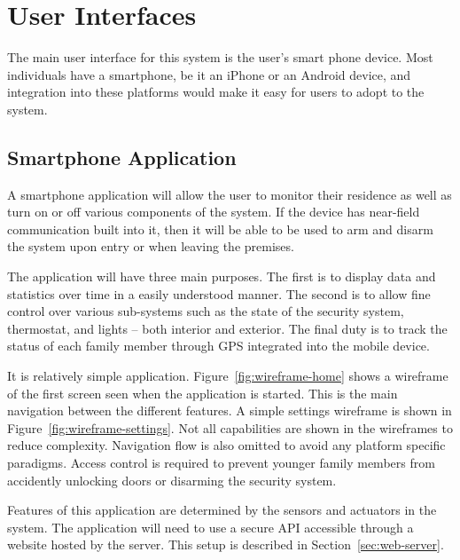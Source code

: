 \documentclass{report}
\begin{document}
\chapter{User Interfaces}
The main user interface for this system is the user's smart phone device. Most
individuals have a smartphone, be it an iPhone or an Android device, and
integration into these platforms would make it easy for users to adopt to the
system.


\section{Smartphone Application}
\label{sec:mobile-app}
A smartphone application will allow the user to monitor their residence as well
as turn on or off various components of the system. If the device has
near-field communication built into it, then it will be able to be used to
arm and disarm the system upon entry or when leaving the premises. 

The application will have three main purposes. The first is to display data and
statistics over time in a easily understood manner. The second is to allow fine
control over various sub-systems such as the state of the security system,
thermostat, and lights -- both interior and exterior. The final duty is to
track the status of each family member through GPS integrated into the mobile
device. 

It is relatively simple application. Figure~\ref{fig:wireframe-home} shows a
wireframe of the first screen seen when the application is started. This is the
main navigation between the different features. A simple settings wireframe is
shown in Figure~\ref{fig:wireframe-settings}. Not all capabilities are shown in
the wireframes to reduce complexity. Navigation flow is also omitted to avoid
any platform specific paradigms. Access control is required to prevent younger
family members from accidently unlocking doors or disarming the security
system.

Features of this application are determined by the sensors and actuators in the
system. The application will need to use a secure API accessible through a
website hosted by the server. This setup is described in
Section~\ref{sec:web-server}.
\end{document}
